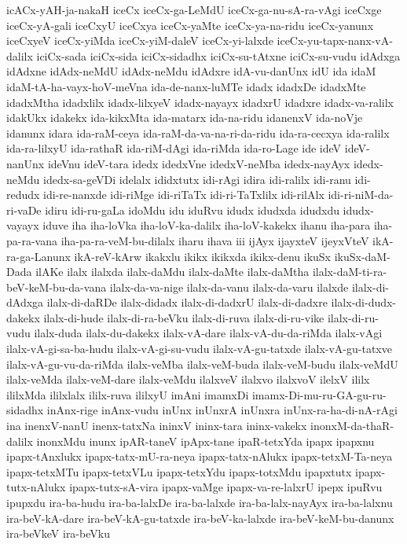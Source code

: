 {icACx-yAH-ja-nakaH
iceCx
iceCx-ga-LeMdU
iceCx-ga-nu-sA-ra-vAgi
iceCxge
iceCx-yA-gali
iceCxyU
iceCxya
iceCx-yaMte
iceCx-ya-na-ridu
iceCx-yanunx
iceCxyeV
iceCx-yiMda
iceCx-yiM-daleV
iceCx-yi-lalxde
iceCx-yu-tapx-nanx-vA-dalilx
iciCx-sada
iciCx-sida
iciCx-sidadhx
iciCx-su-tAtxne
iciCx-su-vudu
idAdxga
idAdxne
idAdx-neMdU
idAdx-neMdu
idAdxre
idA-vu-danUnx
idU
ida
idaM
idaM-tA-ha-vayx-hoV-meVna
ida-de-nanx-luMTe
idadx
idadxDe
idadxMte
idadxMtha
idadxlilx
idadx-lilxyeV
idadx-nayayx
idadxrU
idadxre
idadx-va-ralilx
idakUkx
idakekx
ida-kikxMta
ida-matarx
ida-na-ridu
idanenxV
ida-noVje
idanunx
idara
ida-raM-ceya
ida-raM-da-va-na-ri-da-ridu
ida-ra-cecxya
ida-ralilx
ida-ra-lilxyU
ida-rathaR
ida-riM-dAgi
ida-riMda
ida-ro-Lage
ide
ideV
ideV-nanUnx
ideVnu
ideV-tara
idedx
idedxVne
idedxV-neMba
idedx-nayAyx
idedx-neMdu
idedx-sa-geVDi
idelalx
ididxtutx
idi-rAgi
idira
idi-ralilx
idi-ranu
idi-redudx
idi-re-nanxde
idi-riMge
idi-riTaTx
idi-ri-TaTxlilx
idi-rilAlx
idi-ri-niM-da-ri-vaDe
idiru
idi-ru-gaLa
idoMdu
idu
iduRvu
idudx
idudxda
idudxdu
idudx-vayayx
iduve
iha
iha-loVka
iha-loV-ka-dalilx
iha-loV-kakekx
ihanu
iha-para
iha-pa-ra-vana
iha-pa-ra-veM-bu-dilalx
iharu
ihava
iii
ijAyx
ijayxteV
ijeyxVteV
ikA-ra-ga-Lanunx
ikA-reV-kArw
ikakxlu
ikikx
ikikxda
ikikx-denu
ikuSx
ikuSx-daM-Dada
ilAKe
ilalx
ilalxda
ilalx-daMdu
ilalx-daMte
ilalx-daMtha
ilalx-daM-ti-ra-beV-keM-bu-da-vana
ilalx-da-va-nige
ilalx-da-vanu
ilalx-da-varu
ilalxde
ilalx-di-dAdxga
ilalx-di-daRDe
ilalx-didadx
ilalx-di-dadxrU
ilalx-di-dadxre
ilalx-di-dudx-dakekx
ilalx-di-hude
ilalx-di-ra-beVku
ilalx-di-ruva
ilalx-di-ru-vike
ilalx-di-ru-vudu
ilalx-duda
ilalx-du-dakekx
ilalx-vA-dare
ilalx-vA-du-da-riMda
ilalx-vAgi
ilalx-vA-gi-sa-ba-hudu
ilalx-vA-gi-su-vudu
ilalx-vA-gu-tatxde
ilalx-vA-gu-tatxve
ilalx-vA-gu-vu-da-riMda
ilalx-veMba
ilalx-veM-buda
ilalx-veM-budu
ilalx-veMdU
ilalx-veMda
ilalx-veM-dare
ilalx-veMdu
ilalxveV
ilalxvo
ilalxvoV
ilelxV
ililx
ililxMda
ililxlalx
ililx-ruva
ililxyU
imAni
imamxDi
imamx-Di-mu-ru-GA-gu-ru-sidadhx
inAnx-rige
inAnx-vudu
inUnx
inUnxrA
inUnxra
inUnx-ra-ha-di-nA-rAgi
ina
inenxV-nanU
inenx-tatxNa
ininxV
ininx-tara
ininx-vakekx
inonxM-da-thaR-dalilx
inonxMdu
inunx
ipAR-taneV
ipApx-tane
ipaR-tetxYda
ipapx
ipapxnu
ipapx-tAnxlukx
ipapx-tatx-mU-ra-neya
ipapx-tatx-nAlukx
ipapx-tetxM-Ta-neya
ipapx-tetxMTu
ipapx-tetxVLu
ipapx-tetxYdu
ipapx-totxMdu
ipapxtutx
ipapx-tutx-nAlukx
ipapx-tutx-sA-vira
ipapx-vaMge
ipapx-va-re-lalxrU
ipepx
ipuRvu
ipupxdu
ira-ba-hudu
ira-ba-lalxDe
ira-ba-lalxde
ira-ba-lalx-nayAyx
ira-ba-lalxnu
ira-beV-kA-dare
ira-beV-kA-gu-tatxde
ira-beV-ka-lalxde
ira-beV-keM-bu-danunx
ira-beVkeV
ira-beVku
}

